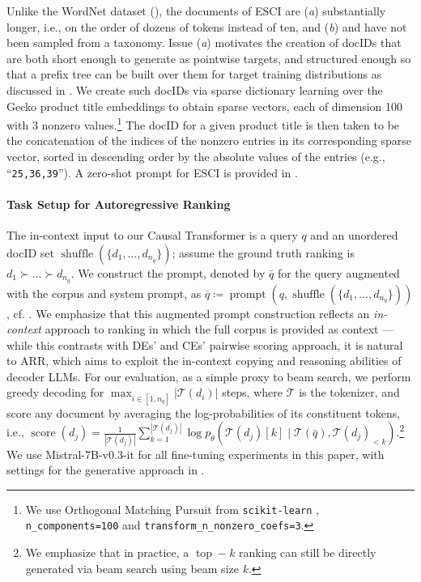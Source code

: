 \documentclass[11pt, a4paper, onecolumn, confidential, copyright, gdm]{google}
\begin{document}
Unlike the WordNet dataset (), the documents of ESCI are (\textit{a}) substantially longer, i.e., on the order of dozens of tokens instead of ten, and (\textit{b}) and have not been sampled from a taxonomy. Issue (\textit{a}) motivates the creation of docIDs that are both short enough to generate as pointwise targets, and structured enough so that a prefix tree can be built over them for target training distributions as discussed in . We create such docIDs via sparse dictionary learning over the Gecko product title embeddings to obtain sparse vectors, each of dimension 100 with 3 nonzero values.\footnote{We use Orthogonal Matching Pursuit from \texttt{scikit-learn} \citep{pedregosa2011scikit}, \texttt{n\_components=100} and \texttt{transform\_n\_nonzero\_coefs=3}.} The docID for a given product title is then taken to be the concatenation of the indices of the nonzero entries in its corresponding sparse vector, sorted in descending order by the absolute values of the entries (e.g., ``\texttt{25,36,39}''). A zero-shot prompt for ESCI is provided in . 

\vspace{-0.6em}
\paragraph{Task Setup for Autoregressive Ranking}\label{sec:task-definition}

The in-context input to our Causal Transformer is a query $q$ and an unordered docID set $\operatorname{shuffle}(\{d_1, \ldots, d_{n_q}\})$; assume the ground truth ranking is $d_1 \succ \ldots \succ d_{n_q}$. We construct the prompt, denoted by $\bar{q}$ for the query augmented with the corpus and system prompt, as $\bar{q} \coloneqq \operatorname{prompt}(q, \operatorname{shuffle}(\{d_1, \ldots, d_{n_q}\}))$, cf. . We emphasize that this augmented prompt construction reflects an \textit{in-context} approach to ranking \citep{gupta2025scalable} in which the full corpus is provided as context — while this contrasts with DEs' and CEs' pairwise scoring approach, it is natural to ARR, which aims to exploit the in-context copying and reasoning abilities of decoder LLMs. For our evaluation, as a simple proxy to beam search, we perform greedy decoding for $\max_{i \in [1, n_q]} |\mathcal{T}(d_i)|$ steps,  where $\mathcal{T}$ is the tokenizer, and score any document by averaging the log-probabilities of its constituent tokens, i.e., $\operatorname{score}(d_j) = \frac{1}{|\mathcal{T}(d_j)|}\sum_{k=1}^{|\mathcal{T}(d_j)|}\log p_\theta (\mathcal{T}(d_j)[k] \mid \mathcal{T}(\bar{q}), \mathcal{T}(d_j)_{<k})$.\footnote{We emphasize that in practice, a $\operatorname{top}-k$ ranking can still be directly generated via beam search using beam size $k$.} We use Mistral-7B-v0.3-it \citep{jiang2024identifying} for all fine-tuning experiments in this paper, with settings for the generative approach in .
\end{document}
